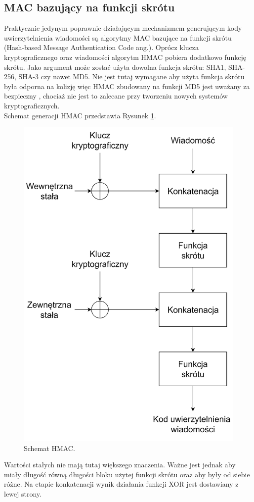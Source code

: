 \subsection{MAC bazujący na funkcji skrótu}
Praktycznie jedynym poprawnie działającym mechanizmem generującym kody uwierzytelnienia wiadomości są algorytmy
MAC bazujące na funkcji skrótu (Hash-based Message Authentication Code ang.). 
Oprócz klucza kryptograficznego oraz wiadomości algorytm HMAC pobiera dodatkowo funkcję skrótu. 
Jako argument może zostać użyta dowolna funkcja skrótu: SHA1, SHA-256, SHA-3 czy nawet MD5. 
Nie jest tutaj wymagane aby użyta funkcja skrótu była odporna na kolizję więc HMAC zbudowany na
funkcji MD5 jest uważany za bezpieczny \cite{hmacmd5}, chociaż nie jest to zalecane przy tworzeniu nowych systemów kryptograficznych. \\
Schemat generacji HMAC przedstawia Rysunek \ref{hmac-scheme}.
\begin{figure}[t]
    \centering
	\includegraphics[width=\textwidth, height=\textheight/2, keepaspectratio]{content/images/hmac}
    \caption{Schemat HMAC.}
    \label{hmac-scheme}
\end{figure} 
\noindent
Wartości stałych nie mają tutaj większego znaczenia. Ważne jest jednak aby miały długość równą długości bloku
użytej funkcji skrótu oraz aby były od siebie różne. 
Na etapie konkatenacji wynik działania funkcji XOR jest dostawiany z lewej strony.

